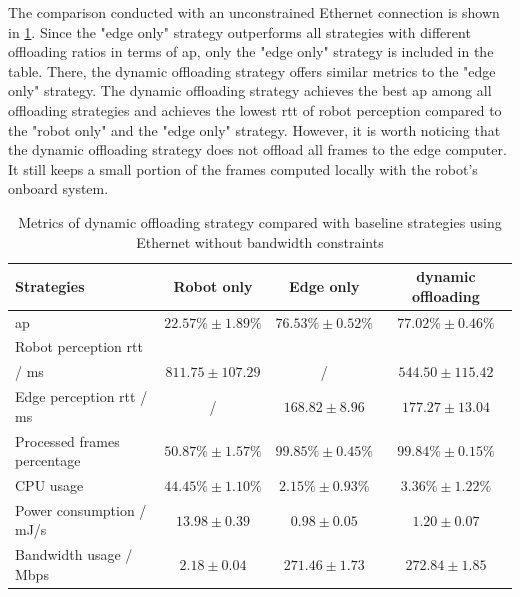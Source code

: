 The comparison conducted with an unconstrained Ethernet connection is shown in \cref{tab:dynamic_eth_320}. Since the "edge only" strategy outperforms all strategies with different offloading ratios in terms of \gls{ap}, only the "edge only" strategy is included in the table. There, the dynamic offloading strategy offers similar metrics to the "edge only" strategy. The dynamic offloading strategy achieves the best \gls{ap} among all offloading strategies and achieves the lowest \gls{rtt} of robot perception compared to the "robot only" and the "edge only" strategy. However, it is worth noticing that the dynamic offloading strategy does not offload all frames to the edge computer. It still keeps a small portion of the frames computed locally with the robot's onboard system. 

\begin{table}[htb]%
    \centering%
    \footnotesize
    \begin{tabular}{l|cc|c}
        \toprule
        Strategies &                        Robot only &            Edge only &              dynamic offloading  \\
        \midrule
        \gls{ap} &                          $22.57\%\pm1.89\%$ &    $76.53\%\pm0.52\%$ &     $\mathbf{77.02\%\pm0.46\%}$  \\
        Robot perception \gls{rtt}\\ / ms &   $811.75\pm 107.29$ &     / &                      $\mathbf{544.50\pm115.42}$   \\
        Edge perception \gls{rtt} / ms &    / &                     $\mathbf{168.82\pm8.96}$ &        $177.27\pm13.04$    \\
        Processed frames percentage &       $50.87\%\pm1.57\%$ &    $\mathbf{99.85\%\pm0.45\%}$ &     $99.84\%\pm0.15\%$  \\
        \midrule
        CPU usage &                         $44.45\% \pm 1.10\%$ &  $\mathbf{2.15\% \pm 0.93\%}$ &    $3.36\% \pm 1.22\%$ \\
        Power consumption / mJ/s &      $13.98 \pm 0.39$ &      $\mathbf{0.98 \pm 0.05}$ &        $1.20 \pm 0.07$     \\
        Bandwidth usage / Mbps &           $\mathbf{2.18 \pm 0.04}$ &       $271.46 \pm 1.73$ &      $272.84 \pm 1.85$   \\
        \bottomrule
    \end{tabular}
    \caption{Metrics of dynamic offloading strategy compared with baseline strategies using Ethernet without bandwidth constraints}
    \label{tab:dynamic_eth_320}%
\end{table}

